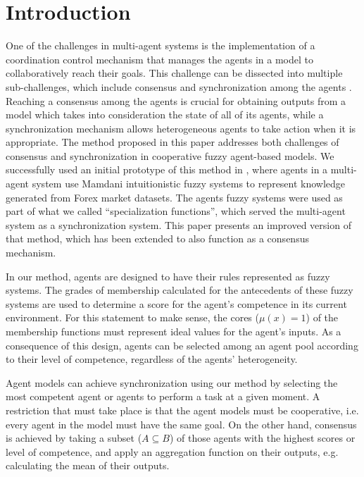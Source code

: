 \section{Introduction}
\label{section:introduction}

One of the challenges in multi-agent systems is the implementation of
a coordination control mechanism that manages the agents in a model to
collaboratively reach their goals. This challenge can be dissected
into multiple sub-challenges, which include consensus and
synchronization among the agents \cite{dorri2018multi}. Reaching a
consensus among the agents is crucial for obtaining outputs from a
model which takes into consideration the state of all of its agents,
while a synchronization mechanism allows heterogeneous agents to take
action when it is appropriate. The method proposed in this paper
addresses both challenges of consensus and synchronization in
cooperative fuzzy agent-based models. We successfully used an initial
prototype of this method in \cite{hernandez2021using}, where agents in
a multi-agent system use Mamdani intuitionistic fuzzy systems to
represent knowledge generated from Forex market datasets. The agents
fuzzy systems were used as part of what we called ``specialization
functions'', which served the multi-agent system as a synchronization
system. This paper presents an improved version of that method, which
has been extended to also function as a consensus mechanism.

In our method, agents are designed to have their rules represented as
fuzzy systems. The grades of membership calculated for the antecedents
of these fuzzy systems are used to determine a score for the agent's
competence in its current environment. For this statement to make
sense, the cores ($\mu (x) = 1$) of the membership functions must
represent ideal values for the agent's inputs. As a consequence of
this design, agents can be selected among an agent pool according to
their level of competence, regardless of the agents' heterogeneity.

Agent models can achieve synchronization using our method by selecting
the most competent agent or agents to perform a task at a given
moment. A restriction that must take place is that the agent models
must be cooperative, i.e. every agent in the model must have the same
goal. On the other hand, consensus is achieved by taking a subset ($A
\subseteq B$) of those agents with the highest scores or level of
competence, and apply an aggregation function on their outputs,
e.g. calculating the mean of their outputs.

